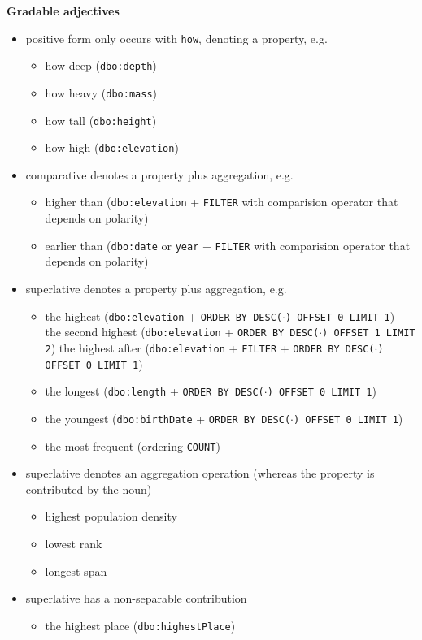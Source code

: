 \documentclass[11pt]{article}
\begin{document}
\textbf{Gradable adjectives}

\begin{itemize}
\item positive form only occurs with \texttt{how}, denoting a property, e.g.
 \begin{itemize}
 \item how deep (\texttt{dbo:depth})
 \item how heavy (\texttt{dbo:mass})
 \item how tall (\texttt{dbo:height})
 \item how high (\texttt{dbo:elevation})
 \end{itemize}
\item comparative denotes a property plus aggregation, e.g. 
 \begin{itemize}
 \item higher than (\texttt{dbo:elevation} + \texttt{FILTER} with comparision operator that depends on polarity) 
 \item earlier than (\texttt{dbo:date} or \texttt{year} + \texttt{FILTER} with comparision operator that depends on polarity)
 \end{itemize}
\item superlative denotes a property plus aggregation, e.g. 
 \begin{itemize}
 \item the highest (\texttt{dbo:elevation} + \texttt{ORDER BY DESC($\cdot$) OFFSET 0 LIMIT 1}) \\
       the second highest (\texttt{dbo:elevation} + \texttt{ORDER BY DESC($\cdot$) OFFSET 1 LIMIT 2})
       the highest after (\texttt{dbo:elevation} + \texttt{FILTER} + \texttt{ORDER BY DESC($\cdot$) OFFSET 0 LIMIT 1})
 \item the longest (\texttt{dbo:length} + \texttt{ORDER BY DESC($\cdot$) OFFSET 0 LIMIT 1}) 
 \item the youngest (\texttt{dbo:birthDate} + \texttt{ORDER BY DESC($\cdot$) OFFSET 0 LIMIT 1})
 \item the most frequent (ordering \texttt{COUNT})
 \end{itemize}
\item superlative denotes an aggregation operation (whereas the property is contributed by the noun)
 \begin{itemize}
 \item highest population density 
 \item lowest rank 
 \item longest span 
 \end{itemize}
\item superlative has a non-separable contribution 
 \begin{itemize}
 \item the highest place (\texttt{dbo:highestPlace}) 
 \end{itemize}
\end{itemize}
\end{document}
